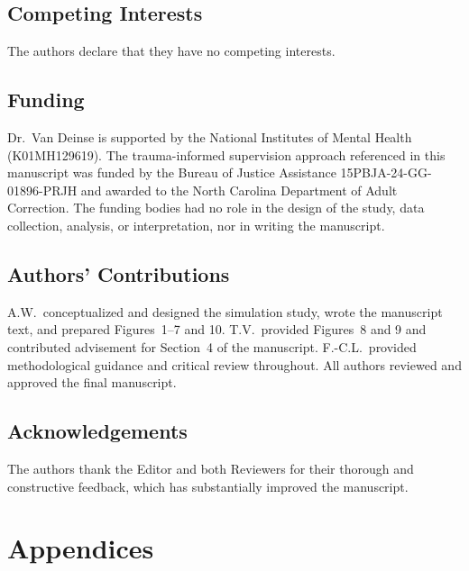 \documentclass{article}[11pt]
\begin{document}
\subsection*{Competing Interests}
The authors declare that they have no competing interests.

\subsection*{Funding}
Dr.\ Van Deinse is supported by the National Institutes of Mental Health (K01MH129619). The trauma-informed supervision approach referenced in this manuscript was funded by the Bureau of Justice Assistance 15PBJA-24-GG-01896-PRJH and awarded to the North Carolina Department of Adult Correction. The funding bodies had no role in the design of the study, data collection, analysis, or interpretation, nor in writing the manuscript.

\subsection*{Authors' Contributions}
A.W.\ conceptualized and designed the simulation study, wrote the manuscript text, and prepared Figures~1--7 and 10. T.V.\ provided Figures~8 and 9 and contributed advisement for Section~4 of the manuscript. F.-C.L.\ provided methodological guidance and critical review throughout. All authors reviewed and approved the final manuscript.

\subsection*{Acknowledgements}
The authors thank the Editor and both Reviewers for their thorough and constructive feedback, which has substantially improved the manuscript.





\clearpage
\appendix
\renewcommand{\thesection}{\Alph{section}}

\section*{Appendices}
\end{document}
